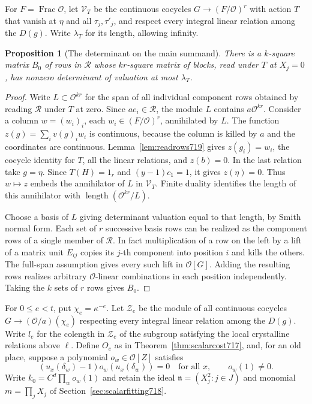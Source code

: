 \documentclass[a4paper,11pt]{article}
\newtheorem{proposition}{Proposition}[section]
\theoremstyle{definition}
\theoremstyle{remark}
\newcommand{\len}{\operatorname{length}}\newcommand{\Res}{\operatorname*{Res}}
\numberwithin{equation}{section}
\begin{document}
For \(F=\operatorname{Frac}\mathcal O\), let \(\mathcal V_T\)
be the continuous cocycles \(G\to(F/\mathcal O)^r\) with action
\(T\) that vanish at \(\eta\) and all \(\tau_j,\tau'_j\), and
respect every integral linear relation among the \(D(g)\).
Write \(\lambda_T\) for its length, allowing infinity.

\begin{proposition}[The determinant on the main summand]
\leavevmode\label{prop:blockrows719}
There is a \(k\)-square matrix \(B_0\) of rows in \(\mathcal R\)
whose \(kr\)-square matrix of blocks, read under \(T\) at
\(X_j=0\), has nonzero determinant of valuation at most
\(\lambda_T\).
\end{proposition}
\begin{proof}
Write \(L\subset\mathcal O^{kr}\) for the span of all individual
component rows obtained by reading \(\mathcal R\) under \(T\)
at zero. Since \(a e_i\in\mathcal R\), the module \(L\) contains
\(a\mathcal O^{kr}\). Consider a column \(w=(w_i)_i\), each
\(w_i\in(F/\mathcal O)^r\), annihilated by \(L\).
The function \(z(g)=\sum_i v(g)_i w_i\) is continuous, because
the column is killed by \(a\) and the coordinates are continuous.
Lemma~\ref{lem:readrows719} gives \(z(g_i)=w_i\), the cocycle
identity for \(T\), all the linear relations, and \(z(b)=0\).
In the last relation take \(g=\eta\). Since \(T(H)=1_r\) and
\((y-1)c_1=1\), it gives \(z(\eta)=0\). Thus \(w\mapsto z\)
embeds the annihilator of \(L\) in \(\mathcal V_T\).
Finite duality identifies the length of this annihilator with
\(\len(\mathcal O^{kr}/L)\).

Choose a basis of \(L\) giving determinant valuation equal to
that length, by Smith normal form. Each set of \(r\) successive
basis rows can be realized as the component rows of a single
member of \(\mathcal R\). In fact multiplication of a row on
the left by a lift of a matrix unit \(E_{ij}\) copies its
\(j\)-th component into position \(i\) and kills the others.
The full-span assumption gives every such lift in
\(\mathcal O[G]\). Adding the resulting rows realizes arbitrary
\(\mathcal O\)-linear combinations in each position independently.
Taking the \(k\) sets of \(r\) rows gives \(B_0\).
\end{proof}

For \(0\le e<t\), put \(\chi_e=\kappa^{-e}\). Let
\(\mathcal Z_e\) be the module of all continuous cocycles
\(G\to(\mathcal O/a)(\chi_e)\) respecting every integral linear
relation among the \(D(g)\). Write \(l_e\) for the colength
in \(\mathcal Z_e\) of the subgroup satisfying the local
crystalline relations above \(\ell\). Define \(O_e\) as
in Theorem~\ref{thm:scalarcost717}, and, for an old place,
suppose a polynomial \(o_w\in\mathcal O[Z]\) satisfies
\[
        (u_x(\delta_w)-1)o_w(u_x(\delta_w))=0
                      \quad\text{for all }x,\qquad o_w(1)\ne0.
\]
Write \(k_0=C^d\prod_w o_w(1)\) and retain the ideal
\(\mathfrak n=(X_j^2:j\in J)\) and monomial
\(m=\prod_j X_j\) of Section~\ref{sec:scalarfitting718}.
\end{document}
